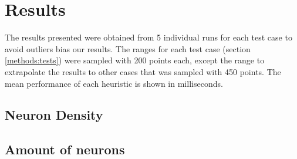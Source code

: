 \chapter{Results}
\label{chapter:results}
The results presented were obtained from 5 individual runs for each test case to avoid outliers bias our results. The ranges for each test case (section \ref{methods:tests}) were sampled with 200 points each, except the range to extrapolate the results to other cases that was sampled with 450 points. The mean performance of each heuristic is shown in milliseconds.

\section{Neuron Density}


\section{Amount of neurons}

